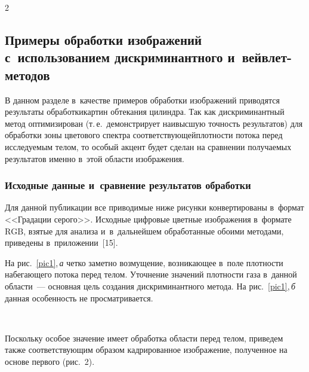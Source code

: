 \begin{multicols}{2}
\subsection{Примеры обработки изображений с~использованием дискриминантного 
и~вейвлет-методов}

В данном разделе в~качестве примеров обработки изображений приводятся результаты 
обработки\linebreak картин обтекания цилиндра. Так как дискриминантный метод оптимизирован 
(т.\,е.\ демонст\-ри\-рует наивысшую точность результатов) для обра\-ботки  зоны 
цветового спектра соответствующей\linebreak плот\-ности потока перед исследуемым телом, 
то особый акцент будет сделан на сравнении получаемых результатов именно в~этой 
об\-ласти изображения.

\subsubsection{Исходные данные и~сравнение результатов обработки}

Для данной публикации все приводимые ниже рисунки конвертированы в~формат 
<<Градации серого>>. Исходные цифровые цветные изображения в~формате~$\mathrm{RGB}$, 
взятые для анализа и~в~дальнейшем обработанные обоими методами, приведены 
в~приложении~[15].

На рис.~\ref{pic1},\,\textit{а} четко заметно возмущение, возникающее в~поле плот\-ности 
набегающего потока перед телом. Уточнение значений плотности газа в~данной области~--- 
основная цель создания дискриминантного метода. На рис.~\ref{pic1},\,\textit{б} 
данная особенность не просматривается.
\begin{figure*} %
\vspace*{1pt}
 \begin{center}  
\mbox{%
 \epsfxsize=157.726mm
 }
\end{center} 
\vspace*{-9pt}
\label{pic1}
\end{figure*}


Поскольку особое значение имеет обработка области перед телом, приведем также 
соответствующим образом кадрированное изображение, полученное на основе 
первого (рис.~2).




\end{multicols}
